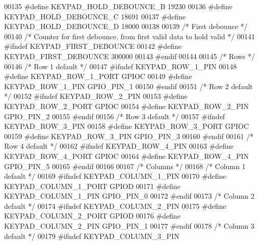 \begin{DoxyCode}
00135 \textcolor{preprocessor}{#define KEYPAD\_HOLD\_DEBOUNCE\_B      19230}
00136 \textcolor{preprocessor}{#define KEYPAD\_HOLD\_DEBOUNCE\_C      18691}
00137 \textcolor{preprocessor}{#define KEYPAD\_HOLD\_DEBOUNCE\_D      18000}
00138 
00139 \textcolor{comment}{/* First debounce */}
00140 \textcolor{comment}{/* Counter for first debounce, from first valid data to hold valid */}
00141 \textcolor{preprocessor}{#ifndef KEYPAD\_FIRST\_DEBOUNCE}
00142 \textcolor{preprocessor}{#define KEYPAD\_FIRST\_DEBOUNCE       300000}
00143 \textcolor{preprocessor}{#endif}
00144 
00145 \textcolor{comment}{/* Rows */}
00146 \textcolor{comment}{/* Row 1 default */}
00147 \textcolor{preprocessor}{#ifndef KEYPAD\_ROW\_1\_PIN}
00148 \textcolor{preprocessor}{#define KEYPAD\_ROW\_1\_PORT           GPIOC}
00149 \textcolor{preprocessor}{#define KEYPAD\_ROW\_1\_PIN            GPIO\_PIN\_1}
00150 \textcolor{preprocessor}{#endif}
00151 \textcolor{comment}{/* Row 2 default */}
00152 \textcolor{preprocessor}{#ifndef KEYPAD\_ROW\_2\_PIN}
00153 \textcolor{preprocessor}{#define KEYPAD\_ROW\_2\_PORT           GPIOC}
00154 \textcolor{preprocessor}{#define KEYPAD\_ROW\_2\_PIN            GPIO\_PIN\_2}
00155 \textcolor{preprocessor}{#endif}
00156 \textcolor{comment}{/* Row 3 default */}
00157 \textcolor{preprocessor}{#ifndef KEYPAD\_ROW\_3\_PIN}
00158 \textcolor{preprocessor}{#define KEYPAD\_ROW\_3\_PORT           GPIOC}
00159 \textcolor{preprocessor}{#define KEYPAD\_ROW\_3\_PIN            GPIO\_PIN\_3}
00160 \textcolor{preprocessor}{#endif}
00161 \textcolor{comment}{/* Row 4 default */}
00162 \textcolor{preprocessor}{#ifndef KEYPAD\_ROW\_4\_PIN}
00163 \textcolor{preprocessor}{#define KEYPAD\_ROW\_4\_PORT           GPIOC}
00164 \textcolor{preprocessor}{#define KEYPAD\_ROW\_4\_PIN            GPIO\_PIN\_5}
00165 \textcolor{preprocessor}{#endif}
00166 
00167 \textcolor{comment}{/* Columns */}
00168 \textcolor{comment}{/* Column 1 default */}
00169 \textcolor{preprocessor}{#ifndef KEYPAD\_COLUMN\_1\_PIN}
00170 \textcolor{preprocessor}{#define KEYPAD\_COLUMN\_1\_PORT        GPIOD}
00171 \textcolor{preprocessor}{#define KEYPAD\_COLUMN\_1\_PIN         GPIO\_PIN\_0}
00172 \textcolor{preprocessor}{#endif}
00173 \textcolor{comment}{/* Column 2 default */}
00174 \textcolor{preprocessor}{#ifndef KEYPAD\_COLUMN\_2\_PIN}
00175 \textcolor{preprocessor}{#define KEYPAD\_COLUMN\_2\_PORT        GPIOD}
00176 \textcolor{preprocessor}{#define KEYPAD\_COLUMN\_2\_PIN         GPIO\_PIN\_1}
00177 \textcolor{preprocessor}{#endif}
00178 \textcolor{comment}{/* Column 3 default */}
00179 \textcolor{preprocessor}{#ifndef KEYPAD\_COLUMN\_3\_PIN}

\end{DoxyCode}
